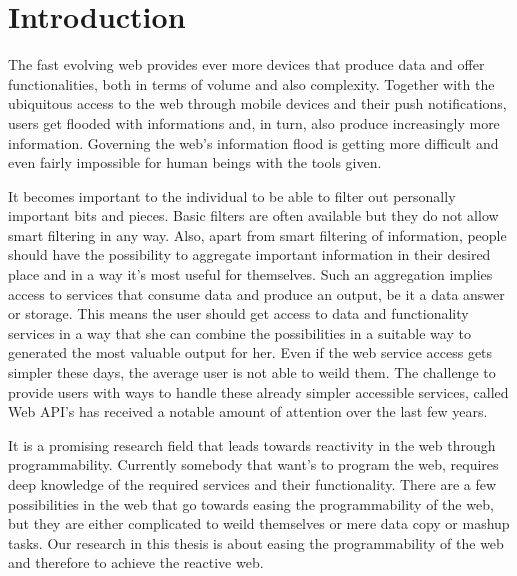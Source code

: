 \chapter{Introduction}
The fast evolving web provides ever more devices that produce data and offer functionalities, both in terms of volume and also complexity.
Together with the ubiquitous access to the web through mobile devices and their push notifications, users get flooded with informations and, in turn, also produce increasingly more information.
Governing the web's information flood is getting more difficult and even fairly impossible for human beings with the tools given.


It becomes important to the individual to be able to filter out personally important bits and pieces.
Basic filters are often available but they do not allow smart filtering in any way.
Also, apart from smart filtering of information, people should have the possibility to aggregate important information in their desired place and in a way it's most useful for themselves.
Such an aggregation implies access to services that consume data and produce an output, be it a data answer or storage.
This means the user should get access to data and functionality services in a way that she can combine the possibilities in a suitable way to generated the most valuable output for her.
Even if the web service access gets simpler these days, the average user is not able to weild them.
The challenge to provide users with ways to handle these already simpler accessible services, called Web API's has received a notable amount of attention over the last few years.




It is a promising research field that leads towards reactivity in the web through programmability.
Currently somebody that want's to program the web, requires deep knowledge of the required services and their functionality.
There are a few possibilities in the web that go towards easing the programmability of the web, but they are either complicated to weild themselves or mere data copy or mashup tasks.
Our research in this thesis is about easing the programmability of the web and therefore to achieve the reactive web. 

